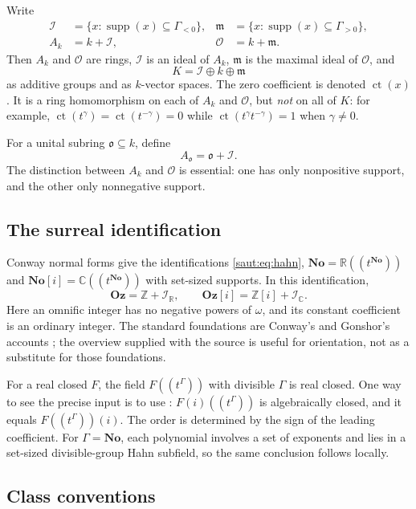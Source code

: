 \documentclass[11pt]{article}
\theoremstyle{definition}
\theoremstyle{remark}
\newcommand{\No}{\mathbf{No}}
\newcommand{\R}{\mathbb R}
\newcommand{\C}{\mathbb C}
\newcommand{\Z}{\mathbb Z}
\newcommand{\OO}{\mathcal O}
\newcommand{\mm}{\mathfrak m}
\newcommand{\supp}{\operatorname{supp}}
\newcommand{\Oz}{\mathbf{Oz}}
\newcommand{\ct}{\operatorname{ct}}
\newcommand{\Ineg}{\mathcal I}
\numberwithin{equation}{section}
\begin{document}
Write
\begin{align*}
 \Ineg&=\{x:\supp(x)\subseteq\Gamma_{<0}\},&
 \mm&=\{x:\supp(x)\subseteq\Gamma_{>0}\},\\
 A_k&=k+\Ineg,& \OO&=k+\mm.
\end{align*}
Then $A_k$ and $\OO$ are rings, $\Ineg$ is an ideal of $A_k$, $\mm$ is the maximal
ideal of $\OO$, and
\begin{equation}\label{saut:fs:eq:three-parts}
 K=\Ineg\oplus k\oplus\mm
\end{equation}
as additive groups and as $k$-vector spaces. The zero coefficient is denoted
$\ct(x)$. It is a ring homomorphism on each of $A_k$ and $\OO$, but \emph{not} on all
of $K$: for example, $\ct(t^\gamma)=\ct(t^{-\gamma})=0$ while
$\ct(t^\gamma t^{-\gamma})=1$ when $\gamma\ne0$.

For a unital subring $\mathfrak o\subseteq k$, define
\[
 A_{\mathfrak o}=\mathfrak o+\Ineg.
\]
The distinction between $A_k$ and $\OO$ is essential: one has only nonpositive
support, and the other only nonnegative support.

\subsection{The surreal identification}

Conway normal forms give the identifications \eqref{saut:eq:hahn}, $\No=\R((t^{\No}))$
and $\No[i]=\C((t^{\No}))$ with set-sized supports. In this identification,
\begin{equation}\label{saut:fs:eq:omnific-hahn}
 \Oz=\Z+\Ineg_{\R},\qquad
 \Oz[i]=\Z[i]+\Ineg_{\C}.
\end{equation}
Here an omnific integer has no negative powers of $\omega$, and its constant
coefficient is an ordinary integer. The standard foundations are Conway's and
Gonshor's accounts \cite{Conway,Gonshor}; the overview \cite{Wiki} supplied with the
source is useful for orientation, not as a substitute for those foundations.

For a real closed $F$, the field $F((t^\Gamma))$ with divisible $\Gamma$ is real
closed. One way to see the precise input is to use \cite[Corollary~4]{Poonen}:
$F(i)((t^\Gamma))$ is algebraically closed, and it equals $F((t^\Gamma))(i)$. The
order is determined by the sign of the leading coefficient. For $\Gamma=\No$, each
polynomial involves a set of exponents and lies in a set-sized divisible-group Hahn
subfield, so the same conclusion follows locally.

\subsection{Class conventions}
\end{document}
